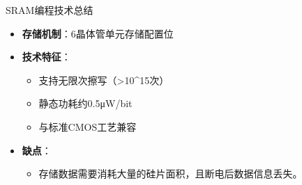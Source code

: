 \documentclass[
  ignorenonframetext,
  chinese,
]{beamer}
\providecommand{\tightlist}{%
  \setlength{\itemsep}{0pt}\setlength{\parskip}{0pt}}
\begin{document}
\begin{frame}
\begin{block}{SRAM编程技术总结}
\label{sramux7f16ux7a0bux6280ux672fux603bux7ed3}
\begin{itemize}
\tightlist
\item
  \textbf{存储机制}：6晶体管单元存储配置位\\
\item
  \textbf{技术特征}：

  \begin{itemize}
  \tightlist
  \item
    支持无限次擦写（\textgreater10\^{}15次）\\
  \item
    静态功耗约0.5μW/bit\\
  \item
    与标准CMOS工艺兼容\\
  \end{itemize}
\item
  \textbf{缺点}：

  \begin{itemize}
  \tightlist
  \item
    存储数据需要消耗大量的硅片面积，且断电后数据信息丢失。
  \end{itemize}
\end{itemize}
\end{block}
\end{frame}
\end{document}
